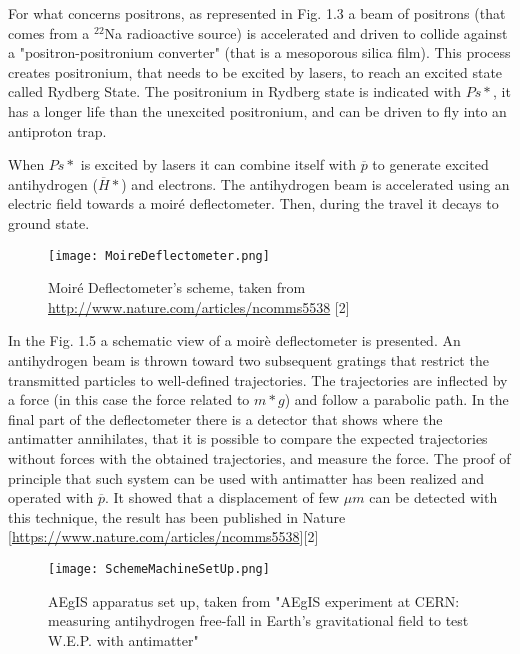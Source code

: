 For what concerns positrons, as represented in Fig. 1.3 a beam of positrons (that comes from a $^{22}$Na radioactive source) is accelerated and driven to collide against a "positron-positronium converter" (that is a mesoporous silica film). This process creates positronium, that needs to be excited by lasers, to reach an excited state called Rydberg State. The positronium in Rydberg state is indicated with $ {Ps*} $, it has a longer life than the unexcited positronium, and can be driven to fly into an antiproton trap.


When $ {Ps*} $ is excited by lasers it can combine itself with $ \overline{p} $ to generate excited antihydrogen ($ \overline{H}* $) and electrons. The antihydrogen beam is accelerated using an electric field towards a moiré deflectometer. Then, during the travel it decays to ground state.  


\begin{figure}[H]
\centering
\texttt{[image: MoireDeflectometer.png]} 
\caption{Moiré Deflectometer's scheme, taken from \url{http://www.nature.com/articles/ncomms5538} [2]}
\end{figure}

In the Fig. 1.5 a schematic view of a moirè deflectometer is presented.
An antihydrogen beam is thrown toward two subsequent gratings that restrict the transmitted particles to well-defined trajectories. The trajectories are inflected by a force (in this case the force related to $ {m*g} $) and follow a parabolic path. In the final part of the deflectometer there is a detector that shows where the antimatter annihilates, that it is possible to compare the expected trajectories without forces with the obtained trajectories, and measure the force. The proof of principle that such system can be used with antimatter has been realized and operated with $ \overline{p} $. It showed that a displacement of few $ \mu m $ can be detected with this technique, the result has been published in Nature [\url{https://www.nature.com/articles/ncomms5538}][2]


\begin{figure}[H]
\centering
\texttt{[image: SchemeMachineSetUp.png]} 
\caption{AEgIS apparatus set up, taken from "AEgIS experiment at CERN: measuring antihydrogen free-fall in Earth’s gravitational field to test W.E.P. with antimatter" }
\end{figure}

